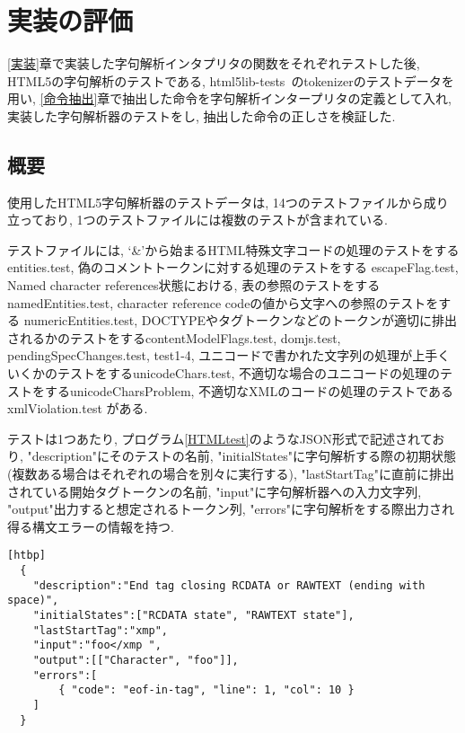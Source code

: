 \documentclass[uplatex,a4j]{jsreport}
\begin{document}
\chapter{実装の評価}
\label{評価}
\ref{実装}章で実装した字句解析インタプリタの関数をそれぞれテストした後, 
HTML5の字句解析のテストである, html5lib-tests~\cite{html5lib-tests}のtokenizerのテストデータを用い, \ref{命令抽出}章で抽出した命令を字句解析インタープリタの定義として入れ, 実装した字句解析器のテストをし, 抽出した命令の正しさを検証した.
\section{概要}
使用したHTML5字句解析器のテストデータは, 14つのテストファイルから成り立っており, 1つのテストファイルには複数のテストが含まれている. 

テストファイルには, 
`\&'から始まるHTML特殊文字コードの処理のテストをするentities.test, 
偽のコメントトークンに対する処理のテストをする escapeFlag.test, 
Named character references状態における, 表の参照のテストをする namedEntities.test, 
character reference codeの値から文字への参照のテストをする numericEntities.test, 
DOCTYPEやタグトークンなどのトークンが適切に排出されるかのテストをするcontentModelFlags.test, domjs.test, pendingSpecChanges.test, test1-4, 
ユニコードで書かれた文字列の処理が上手くいくかのテストをするunicodeChars.test, 
不適切な場合のユニコードの処理のテストをするunicodeCharsProblem, 
不適切なXMLのコードの処理のテストであるxmlViolation.test 
がある. 

テストは1つあたり, プログラム\ref{HTMLtest}のようなJSON形式で記述されており, 
"description"にそのテストの名前, "initialStates"に字句解析する際の初期状態(複数ある場合はそれぞれの場合を別々に実行する), "lastStartTag"に直前に排出されている開始タグトークンの名前, 
"input"に字句解析器への入力文字列, "output"出力すると想定されるトークン列, "errors"に字句解析をする際出力され得る構文エラーの情報を持つ. 
\begin{lstlisting}[basicstyle=\ttfamily\footnotesize, frame=single, caption=HTML5lib contentModelFlags.test,label=HTMLtest][htbp]
  {
    "description":"End tag closing RCDATA or RAWTEXT (ending with space)",
    "initialStates":["RCDATA state", "RAWTEXT state"],
    "lastStartTag":"xmp",
    "input":"foo</xmp ",
    "output":[["Character", "foo"]],
    "errors":[
        { "code": "eof-in-tag", "line": 1, "col": 10 }
    ]
  }
\end{lstlisting}
\end{document}
